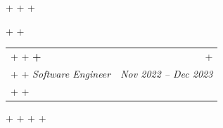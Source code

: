 \documentclass[letterpaper,10pt]{article}                                                                                                                                                                                                                                                                                                                                                                                                                                                                                                                                                                         +
\makeatletter
\newcommand{\resumeSubheading}[4]{                                                                                                                                                                                                                                                                                                                                                                                                                                                                                                                                                                                +
                                                                                                                                                                                                                                                                                                                                                                                                                                                                                                                                                                                                                   +
   \vspace{-2pt}\item                                                                                                                                                                                                                                                                                                                                                                                                                                                                                                                                                                                              +
                                                                                                                                                                                                                                                                                                                                                                                                                                                                                                                                                                                                                   +
     \begin{tabular*}{0.97\textwidth}[t]{l@{\extracolsep{\fill}}r}                                                                                                                                                                                                                                                                                                                                                                                                                                                                                                                                                 +
                                                                                                                                                                                                                                                                                                                                                                                                                                                                                                                                                                                                                   +
       \textbf{#1} & #2 \\                                                                                                                                                                                                                                                                                                                                                                                                                                                                                                                                                                                         +
                                                                                                                                                                                                                                                                                                                                                                                                                                                                                                                                                                                                                   +
       \textit{\small#3} & \textit{\small #4} \\                                                                                                                                                                                                                                                                                                                                                                                                                                                                                                                                                                   +
                                                                                                                                                                                                                                                                                                                                                                                                                                                                                                                                                                                                                   +
     \end{tabular*}\vspace{-6pt}                                                                                                                                                                                                                                                                                                                                                                                                                                                                                                                                                                                   +
                                                                                                                                                                                                                                                                                                                                                                                                                                                                                                                                                                                                                   +
 }                                                                                                                                                                                                                                                                                                                                                                                                                                                                                                                                                                                                                 +
\makeatother
\begin{document}
                                                                                                                                                                                                                                                                                                                                                                                                                                                                                                                                                                                                                   +
 \resumeSubheading                                                                                                                                                                                                                                                                                                                                                                                                                                                                                                                                                                                                 +
                                                                                                                                                                                                                                                                                                                                                                                                                                                                                                                                                                                                                   +
   {Software Engineer}{Nov 2022 -- Dec 2023}                                                                                                                                                                                                                                                                                                                                                                                                                                                                                                                                                                       +
                                                                                                                                                                                                                                                                                                                                                                                                                                                                                                                                                                                                                   +
\end{document}
